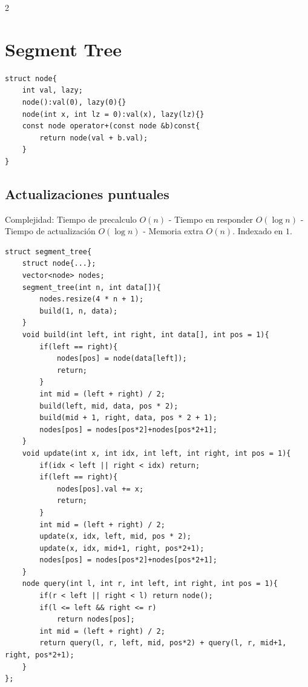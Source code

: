 \documentclass[10pt,spanish,mexico]{article}
\numberwithin{equation}{section}
\begin{document}
\begin{multicols}{2}
\vspace{-1.2\baselineskip}
\hrulefill
\section{Segment Tree}
\begin{verbatim}
struct node{
    int val, lazy;
    node():val(0), lazy(0){}
    node(int x, int lz = 0):val(x), lazy(lz){}
    const node operator+(const node &b)const{
        return node(val + b.val);
    }
}
\end{verbatim}

\vspace{-1.2\baselineskip}
\hrulefill
\subsection{Actualizaciones puntuales}
Complejidad: Tiempo de precalculo $O(n)$ - Tiempo en responder $O(\log n)$ - Tiempo de actualización $O(\log n)$ - Memoria extra $O(n)$. Indexado en $1$.
\begin{verbatim}
struct segment_tree{
    struct node{...};
    vector<node> nodes;
    segment_tree(int n, int data[]){
        nodes.resize(4 * n + 1);
        build(1, n, data);
    }
    void build(int left, int right, int data[], int pos = 1){
        if(left == right){
            nodes[pos] = node(data[left]);
            return;
        }
        int mid = (left + right) / 2;
        build(left, mid, data, pos * 2);
        build(mid + 1, right, data, pos * 2 + 1);
        nodes[pos] = nodes[pos*2]+nodes[pos*2+1];
    }
    void update(int x, int idx, int left, int right, int pos = 1){
        if(idx < left || right < idx) return;
        if(left == right){
            nodes[pos].val += x;
            return;
        }
        int mid = (left + right) / 2;
        update(x, idx, left, mid, pos * 2);
        update(x, idx, mid+1, right, pos*2+1);
        nodes[pos] = nodes[pos*2]+nodes[pos*2+1];
    }
    node query(int l, int r, int left, int right, int pos = 1){
        if(r < left || right < l) return node();
        if(l <= left && right <= r)
            return nodes[pos];
        int mid = (left + right) / 2;
        return query(l, r, left, mid, pos*2) + query(l, r, mid+1, right, pos*2+1);
    }
};
\end{verbatim}

\vspace{-1.2\baselineskip}
\hrulefill

\end{multicols}
\end{document}

